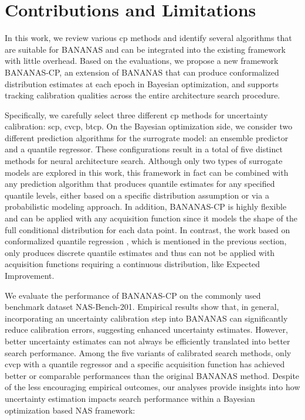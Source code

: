 \documentclass[a4paper,oneside,bibliography=totoc]{scrbook}
\begin{document}
\section{Contributions and Limitations}
In this work, we review various \gls{cp} methods and identify several algorithms that are suitable for BANANAS and can be integrated into the existing framework with little overhead. Based on the evaluations, we propose a new framework BANANAS-CP, an extension of BANANAS that can produce conformalized distribution estimates at each epoch in Bayesian optimization, and supports tracking calibration qualities across the entire architecture search procedure. 

Specifically, we carefully select three different \gls{cp} methods for uncertainty calibration: \gls{scp}, \gls{cvcp}, \gls{btcp}. On the Bayesian optimization side, we consider two different prediction algorithms for the surrograte model: an ensemble predictor and a quantile regressor. These configurations result in a total of five distinct methods for neural architecture search. Although only two types of surrogate models are explored in this work, this framework in fact can be combined with any prediction algorithm that produces quantile estimates for any specified quantile levels, either based on a specific distribution assumption or via a probabilistic modeling approach. In addition, BANANAS-CP is highly flexible and can be applied with any acquisition function since it models the shape of the full conditional distribution for each data point. In contrast, the work based on conformalized quantile regression \cite{salinas2023optimizing}, which is mentioned in the previous section, only produces discrete quantile estimates and thus can not be applied with acquisition functions requiring a continuous distribution, like Expected Improvement.

We evaluate the performance of BANANAS-CP on the commonly used benchmark dataset NAS-Bench-201. Empirical results show that, in general, incorporating an uncertainty calibration step into BANANAS can significantly reduce calibration errors, suggesting enhanced uncertainty estimates. However, better uncertainty estimates can not always be efficiently translated into better search performance. Among the five variants of calibrated search methods, only \gls{cvcp} with a quantile regressor and a specific acquisition function has achieved better or comparable performances than the original BANANAS method. Despite of the  less encouraging empirical outcomes, our analyses provide insights into how uncertainty estimation impacts search performance within a Bayesian optimization based NAS framework:
\end{document}
